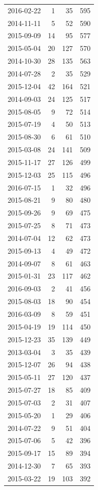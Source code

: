 \begin{tabular}{lrrr}
2016-02-22 & 1 & 35 & 595 \\
2014-11-11 & 5 & 52 & 590 \\
2015-09-09 & 14 & 95 & 577 \\
2015-05-04 & 20 & 127 & 570 \\
2014-10-30 & 28 & 135 & 563 \\
2014-07-28 & 2 & 35 & 529 \\
2015-12-04 & 42 & 164 & 521 \\
2014-09-03 & 24 & 125 & 517 \\
2015-08-05 & 9 & 72 & 514 \\
2015-07-19 & 4 & 50 & 513 \\
2015-08-30 & 6 & 61 & 510 \\
2015-03-08 & 24 & 141 & 509 \\
2015-11-17 & 27 & 126 & 499 \\
2015-12-03 & 25 & 115 & 496 \\
2016-07-15 & 1 & 32 & 496 \\
2015-08-21 & 9 & 80 & 480 \\
2015-09-26 & 9 & 69 & 475 \\
2015-07-25 & 8 & 71 & 473 \\
2014-07-04 & 12 & 62 & 473 \\
2015-09-13 & 4 & 49 & 472 \\
2014-09-07 & 8 & 61 & 463 \\
2015-01-31 & 23 & 117 & 462 \\
2016-09-03 & 2 & 41 & 456 \\
2015-08-03 & 18 & 90 & 454 \\
2016-03-09 & 8 & 59 & 451 \\
2015-04-19 & 19 & 114 & 450 \\
2015-12-23 & 35 & 139 & 449 \\
2013-03-04 & 3 & 35 & 439 \\
2015-12-07 & 26 & 94 & 438 \\
2015-05-11 & 27 & 120 & 437 \\
2015-07-27 & 18 & 85 & 409 \\
2015-07-03 & 2 & 31 & 407 \\
2015-05-20 & 1 & 29 & 406 \\
2014-07-22 & 9 & 51 & 404 \\
2015-07-06 & 5 & 42 & 396 \\
2015-09-17 & 15 & 89 & 394 \\
2014-12-30 & 7 & 65 & 393 \\
2015-03-22 & 19 & 103 & 392 \\

\end{tabular}
